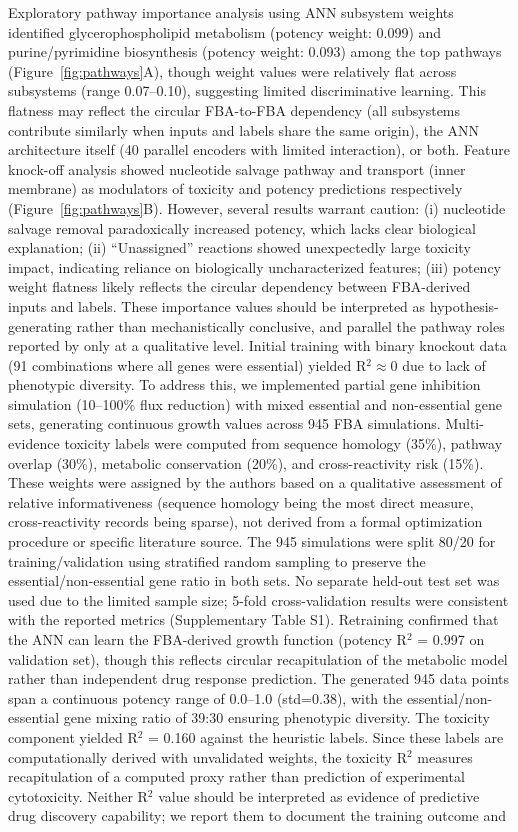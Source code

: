 \documentclass[12pt,a4paper]{article}
\begin{document}
Exploratory pathway importance analysis using ANN subsystem weights identified glycerophospholipid metabolism (potency weight: 0.099) and purine/pyrimidine biosynthesis (potency weight: 0.093) among the top pathways (Figure~\ref{fig:pathways}A), though weight values were relatively flat across subsystems (range 0.07--0.10), suggesting limited discriminative learning. This flatness may reflect the circular FBA-to-FBA dependency (all subsystems contribute similarly when inputs and labels share the same origin), the ANN architecture itself (40 parallel encoders with limited interaction), or both. Feature knock-off analysis showed nucleotide salvage pathway and transport (inner membrane) as modulators of toxicity and potency predictions respectively (Figure~\ref{fig:pathways}B). However, several results warrant caution: (i) nucleotide salvage removal paradoxically increased potency, which lacks clear biological explanation; (ii) ``Unassigned'' reactions showed unexpectedly large toxicity impact, indicating reliance on biologically uncharacterized features; (iii) potency weight flatness likely reflects the circular dependency between FBA-derived inputs and labels. These importance values should be interpreted as hypothesis-generating rather than mechanistically conclusive, and parallel the pathway roles reported by \citet{arora2026} only at a qualitative level. Initial training with binary knockout data (91 combinations where all genes were essential) yielded R$^2 \approx 0$ due to lack of phenotypic diversity. To address this, we implemented partial gene inhibition simulation (10--100\% flux reduction) with mixed essential and non-essential gene sets, generating continuous growth values across 945 FBA simulations. Multi-evidence toxicity labels were computed from sequence homology (35\%), pathway overlap (30\%), metabolic conservation (20\%), and cross-reactivity risk (15\%). These weights were assigned by the authors based on a qualitative assessment of relative informativeness (sequence homology being the most direct measure, cross-reactivity records being sparse), not derived from a formal optimization procedure or specific literature source. The 945 simulations were split 80/20 for training/validation using stratified random sampling to preserve the essential/non-essential gene ratio in both sets. No separate held-out test set was used due to the limited sample size; 5-fold cross-validation results were consistent with the reported metrics (Supplementary Table S1). Retraining confirmed that the ANN can learn the FBA-derived growth function (potency R$^2$ = 0.997 on validation set), though this reflects circular recapitulation of the metabolic model rather than independent drug response prediction. The generated 945 data points span a continuous potency range of 0.0--1.0 (std=0.38), with the essential/non-essential gene mixing ratio of 39:30 ensuring phenotypic diversity. The toxicity component yielded R$^2$ = 0.160 against the heuristic labels. Since these labels are computationally derived with unvalidated weights, the toxicity R$^2$ measures recapitulation of a computed proxy rather than prediction of experimental cytotoxicity. Neither R$^2$ value should be interpreted as evidence of predictive drug discovery capability; we report them to document the training outcome and 
\end{document}
